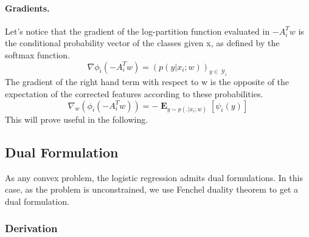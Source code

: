 \documentclass{article}
\DeclareMathOperator{\1}{\mathbb{1}}
\DeclareMathOperator{\E}{\mathbf{E}}
\DeclareMathOperator{\Y}{\mathcal{Y}}
\begin{document}
\paragraph{Gradients.}
Let's notice that the gradient of the log-partition function evaluated in $-A_i^Tw$ is the conditional probability vector of the classes given x, as defined by the softmax function.
\begin{equation}
	\nabla \phi_i(-A_i^Tw) = (p(y | x_i ; w))_{y \in \Y_i}
\end{equation}
The gradient of the right hand term with respect to w is the opposite of the expectation of the corrected features according to these probabilities.
\begin{equation}
	\label{primal gradient}
	\nabla_w (\phi_i(-A_i^Tw)) = - \E_{y \sim p(. | x_i ; w)} [\psi_i(y)]
\end{equation}
This will prove useful in the following.



\subsection{Dual Formulation}

As any convex problem, the logistic regression admits dual formulations.
In this case, as the problem is unconstrained, we use Fenchel duality theorem to get a dual formulation.

\subsubsection{Derivation}
\end{document}
